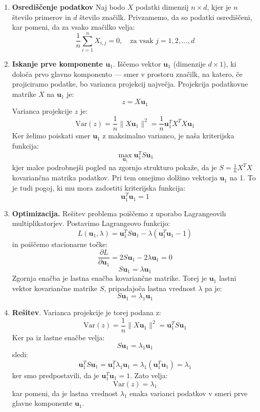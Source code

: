 \begin{enumerate} 

\item {\bf Osrediščenje podatkov} Naj bodo \( X \) podatki dimenzij \( n \times d \), kjer je \( n \) število primerov in \( d \) število značilk. Privzamemo, da so podatki osrediščeni, kar pomeni, da za vsako značilko velja:
\[
\frac{1}{n} \sum_{i=1}^{n} X_{i,j} = 0, \quad \text{za vsak } j = 1, 2, \dots, d
\]

\item {\bf Iskanje prve komponente \( \mathbf{u}_1 \)}. Iščemo vektor \( \mathbf{u}_1 \) (dimenzije \( d \times 1 \)), ki določa prvo glavno komponento — smer v prostoru značilk, na katero, če projiciramo podatke, bo varianca projekcij največja. Projekcija podatkovne matrike \( X \) na \( \mathbf{u}_1 \) je:
\[
z = X \mathbf{u}_1
\]
Varianca projekcije \( z \) je:
\[
\mathrm{Var}(z) = \frac{1}{n} \| X \mathbf{u}_1 \|^2 = \frac{1}{n} \mathbf{u}_1^T X^T X \mathbf{u}_1
\]
Ker želimo poiskati smer $\mathbf{u}_1$ z maksimalno varianco, je naša kriterijska funkcija:
\[
\max_{\mathbf{u}_1} \mathbf{u}_1^T S \mathbf{u}_1
\]
kjer malce podrobnejši pogled na zgornjo strukturo pokaže, da je \( S = \frac{1}{n} X^T X \) kovariančna matrika podatkov. Pri tem omejimo dolžino vektorja \( \mathbf{u}_1 \) na 1. To je tudi pogoj, ki mu mora zadostiti kriterijska funkcija:
\[
\mathbf{u}_1^T \mathbf{u}_1 = 1
\]

\item {\bf Optimizacija.} Rešitev problema poiščemo z uporabo Lagrangeovih multiplikatorjev. Postavimo Lagrangeovo funkcijo:
\[
L(\mathbf{u}_1, \lambda) = \mathbf{u}_1^T S \mathbf{u}_1 - \lambda (\mathbf{u}_1^T \mathbf{u}_1 - 1)
\]
in poiščemo stacionarne točke:
\[
\frac{\partial L}{\partial \mathbf{u}_1} = 2 S \mathbf{u}_1 - 2 \lambda \mathbf{u}_1 = 0
\]
\[
S \mathbf{u}_1 = \lambda \mathbf{u}_1
\]
Zgornja enačba je lastna enačba kovariančne matrike. Torej je \( \mathbf{u}_1 \) lastni vektor kovariančne matrike \( S \), pripadajoča lastna vrednost \( \lambda \) pa je:
\[
S \mathbf{u}_1 = \lambda_1 \mathbf{u}_1
\]

\item {\bf Rešitev}. Varianca projekcije je torej podana z:
\[
\mathrm{Var}(z) = \frac{1}{n} \| X \mathbf{u}_1 \|^2 = \mathbf{u}_1^T S \mathbf{u}_1
\]
Ker pa iz lastne enačbe velja:
\[
S \mathbf{u}_1 = \lambda_1 \mathbf{u}_1
\]
sledi:
\[
\mathbf{u}_1^T S \mathbf{u}_1 = \mathbf{u}_1^T \lambda_1 \mathbf{u}_1 = \lambda_1 (\mathbf{u}_1^T \mathbf{u}_1) = \lambda_1
\]
ker smo predpostavili, da je \( \mathbf{u}_1^T \mathbf{u}_1 = 1 \). Zato velja:
\[
\mathrm{Var}(z) = \lambda_1
\]
kar pomeni, da je lastna vrednost \( \lambda_1 \) enaka varianci podatkov v smeri prve glavne komponente \( \mathbf{u}_1 \).


\end{enumerate}
